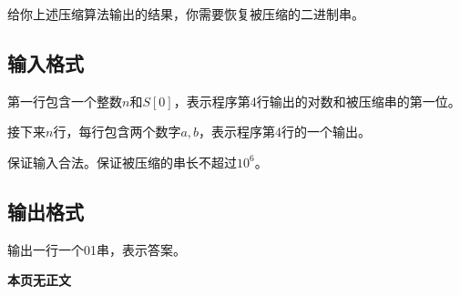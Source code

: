 给你上述压缩算法输出的结果，你需要恢复被压缩的二进制串。

\subsection*{输入格式}

第一行包含一个整数$n$和$S[0]$，表示程序第4行输出的对数和被压缩串的第一位。

接下来$n$行，每行包含两个数字$a, b$，表示程序第4行的一个输出。

保证输入合法。保证被压缩的串长不超过$10^6$。

\subsection*{输出格式}

输出一行一个01串，表示答案。

\setcounter{ExampleNo}{0}


\clearpage

\ifodd\value{page}
\else
    \vspace*{\fill}
    \begin{center}
    \textbf{\Large 本页无正文}
    \end{center}
    \vspace*{\fill}
    \clearpage
\fi

